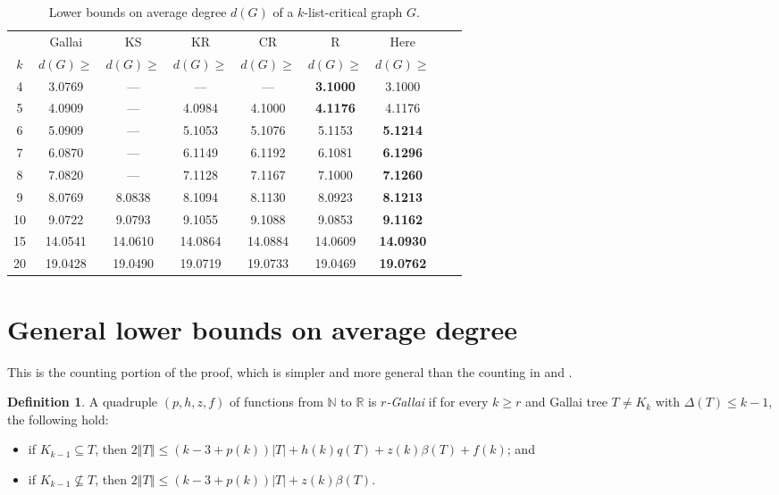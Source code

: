 \documentclass[10pt]{article}
\renewcommand{\ge}{\geqslant}
\renewcommand{\le}{\leqslant}
\theoremstyle{plain}
\theoremstyle{definition}
\newtheorem{defn}{Definition}
\theoremstyle{remark}
\newcommand{\IN}{\mathbb{N}}
\newcommand{\IR}{\mathbb{R}}
\newcommand{\card}[1]{\left|#1\right|}
\newcommand{\size}[1]{\left\Vert#1\right\Vert}
\newcommand{\parens}[1]{\left( #1 \right)}
\begin{document}
\begin{table}
	\begin{center}
		\begin{tabular}{|c|c|c|c|c|c|c|c|c|}
			\hline
			& Gallai \cite{gallai1963kritische}
			& KS \cite{kostochkastiebitzedgesincriticalgraph} 
			& KR \cite{OreVizing}
			& CR \cite{DischargingLowerBound}
			& R \cite{Better4ListCriticalBound}
			& Here \\
			$k$ & $d(G) \ge$ & $d(G) \ge$ & $d(G) \ge$ & $d(G) \ge$ & $d(G) \ge$ & $d(G) \ge$\\
			\hline 
			4 & 3.0769 & --- & --- & --- & \bf{3.1000} & 3.1000\\
			5 & 4.0909 & --- & 4.0984 & 4.1000 & \bf{4.1176} & 4.1176\\
			6 & 5.0909 & --- & 5.1053 & 5.1076 & 5.1153 & \bf{5.1214}\\
			7 & 6.0870 & --- & 6.1149 & 6.1192} & 6.1081 & \bf{6.1296}\\
			8 & 7.0820 & --- & 7.1128 & 7.1167} & 7.1000 & \bf{7.1260}\\
			9 & 8.0769 & 8.0838 & 8.1094 & 8.1130} & 8.0923 & \bf{8.1213}\\
			10 & 9.0722 & 9.0793 & 9.1055 & 9.1088} & 9.0853 & \bf{9.1162}\\
			15 & 14.0541 & 14.0610 & 14.0864 & 14.0884} & 14.0609 & \bf{14.0930}\\
			20 & 19.0428 & 19.0490 & 19.0719 & 19.0733} & 19.0469 & \bf{19.0762}\\
			\hline
		\end{tabular}
	\end{center}
	\caption{Lower bounds on average degree $d(G)$ of a $k$-list-critical graph $G$.}
	\label{TheTable}
\end{table}

\section{General lower bounds on average degree}
This is the counting portion of the proof, which is simpler and more general than the counting in \cite{OreVizing} and \cite{DischargingLowerBound}.
\begin{defn}
A quadruple $\parens{p,h,z,f}$ of functions from $\IN$ to $\IR$ is \emph{$r$-Gallai} if for every $k \ge r$ and Gallai tree $T \ne K_k$ with $\Delta(T) \le k-1$,
the following hold:
\begin{itemize}
\item if $K_{k-1} \subseteq T$, then $2\size{T} \le \parens{k-3 + p(k)}\card{T} + h(k)q(T) + z(k)\beta(T) + f(k)$; and
\item if $K_{k-1} \not\subseteq T$, then $2\size{T} \le \parens{k-3 + p(k)}\card{T} + z(k)\beta(T)$.
\end{itemize}
\end{defn}
\end{document}
